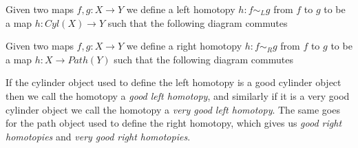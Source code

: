 \begin{definition}
\label{def:left_homotopy}
Given two maps $f,g: X\rightarrow Y$ we define a left homotopy $h:f\sim_L g$ from $f$ to $g$ to be a map $h: Cyl(X)\rightarrow Y$ such that the following diagram commutes
\begin{center}
\end{center}
\end{definition}

\begin{definition}
\label{def:right_homotopy}
Given two maps $f,g: X\rightarrow Y$ we define a right homotopy $h:f\sim_R g$ from $f$ to $g$ to be a map $h: X\rightarrow Path(Y)$ such that the following diagram commutes
\begin{center}
\end{center}
\end{definition}

If the cylinder object used to define the left homotopy is a good cylinder object then we call the homotopy a \emph{good left homotopy}, and similarly if it is a very good cylinder object we call the homotopy a \emph{very good left homotopy}. The same goes for the path object used to define the right homotopy, which gives us \emph{good right homotopies} and \emph{very good right homotopies}.


